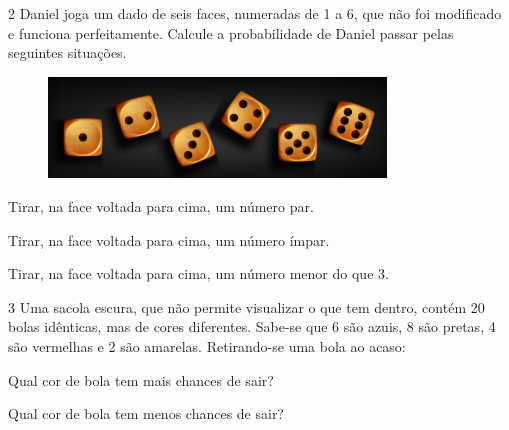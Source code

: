 \num{2} Daniel joga um dado de seis faces, numeradas de 1 a 6, que não foi modificado e funciona perfeitamente. Calcule a probabilidade de Daniel passar pelas seguintes situações.

\begin{figure}[htpb!]
\centering
\includegraphics[width=0.8\textwidth]{./media/image75a.jpg}
\end{figure}

\begin{escolha}
\item Tirar, na face voltada para cima, um número par.

\item Tirar, na face voltada para cima, um número ímpar.

\item Tirar, na face voltada para cima, um número menor do que 3.
\end{escolha}

\num{3} Uma sacola escura, que não permite visualizar o que tem dentro, contém
20 bolas idênticas, mas de cores diferentes. Sabe-se que 6 são azuis, 8
são pretas, 4 são vermelhas e 2 são amarelas. Retirando-se uma bola ao
acaso:

\begin{escolha}
\item Qual cor de bola tem mais chances de sair?

\item  Qual cor de bola tem menos chances de sair?
\end{escolha}

